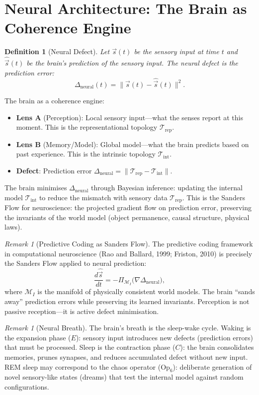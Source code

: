 \documentclass[12pt, openany]{book}
\newtheorem{definition}[theorem]{Definition}
\theoremstyle{remark}
\newtheorem{remark}[theorem]{Remark}
\newcommand{\Tint}{\mathcal{T}_{\mathrm{int}}}
\newcommand{\Trep}{\mathcal{T}_{\mathrm{rep}}}
\begin{document}
\section{Neural Architecture: The Brain as Coherence Engine}
\label{sec:neural}

\begin{definition}[Neural Defect]
\label{def:neural-defect}
Let $\vec{s}(t)$ be the sensory input at time $t$ and $\hat{\vec{s}}(t)$ be the
brain's prediction of the sensory input.  The neural defect is the prediction
error:
\[
  \Delta_{\mathrm{neural}}(t) = \|\vec{s}(t) - \hat{\vec{s}}(t)\|^2.
\]
\end{definition}

\noindent
The brain as a coherence engine:
\begin{itemize}
  \item \textbf{Lens A} (Perception): Local sensory input---what the senses report
        at this moment.  This is the representational topology $\Trep$.
  \item \textbf{Lens B} (Memory/Model): Global model---what the brain predicts
        based on past experience.  This is the intrinsic topology $\Tint$.
  \item \textbf{Defect}: Prediction error $\Delta_{\mathrm{neural}} = \|\Trep - \Tint\|$.
\end{itemize}

\noindent
The brain minimises $\Delta_{\mathrm{neural}}$ through Bayesian inference: updating
the internal model $\Tint$ to reduce the mismatch with sensory data $\Trep$.
This is the Sanders Flow for neuroscience: the projected gradient flow on prediction
error, preserving the invariants of the world model (object permanence, causal
structure, physical laws).

\begin{remark}[Predictive Coding as Sanders Flow]
The predictive coding framework in computational neuroscience (Rao and Ballard, 1999;
Friston, 2010) is precisely the Sanders Flow applied to neural prediction:
\[
  \frac{d\hat{\vec{s}}}{dt} = -\Pi_{\mathcal{M}_I}\!\bigl(\nabla \Delta_{\mathrm{neural}}\bigr),
\]
where $\mathcal{M}_I$ is the manifold of physically consistent world models.
The brain ``sands away'' prediction errors while preserving its learned invariants.
Perception is not passive reception---it is active defect minimisation.
\end{remark}

\begin{remark}[Neural Breath]
The brain's breath is the sleep-wake cycle.  Waking is the expansion phase ($E$):
sensory input introduces new defects (prediction errors) that must be processed.
Sleep is the contraction phase ($C$): the brain consolidates memories, prunes
synapses, and reduces accumulated defect without new input.  REM sleep may
correspond to the chaos operator ($\mathrm{Op}_6$): deliberate generation of novel
sensory-like states (dreams) that test the internal model against random
configurations.
\end{remark}
\end{document}
